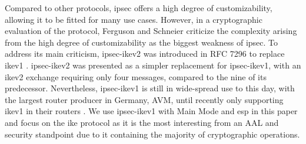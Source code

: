 Compared to other protocols, \ac{ipsec} offers a high degree of customizability, allowing it to be fitted for many use cases. However, in a cryptographic evaluation of the protocol, Ferguson and Schneier \cite{ferguson1999cryptographic} criticize the complexity arising from the high degree of customizability as the biggest weakness of \ac{ipsec}. To address its main criticism, \ac{ipsec}-\ac{ike}v2 was introduced in RFC 7296 to replace \ac{ike}v1 \cite{rfc:ikev2}. \ac{ipsec}-\ac{ike}v2 was presented as a simpler replacement for \ac{ipsec}-\ac{ike}v1, with an \ac{ike}v2 exchange requiring only four messages, compared to the nine of its predecessor. Nevertheless, \ac{ipsec}-\ac{ike}v1 is still in wide-spread use to this day, with the largest router producer in Germany, AVM, until recently only supporting \ac{ike}v1 in their routers \cite{avm2022}. We use \ac{ipsec}-\ac{ike}v1 with Main Mode and \ac{esp} in this paper and focus on the \ac{ike} protocol as it is the most interesting from an AAL and security standpoint due to it containing the majority of cryptographic operations.
